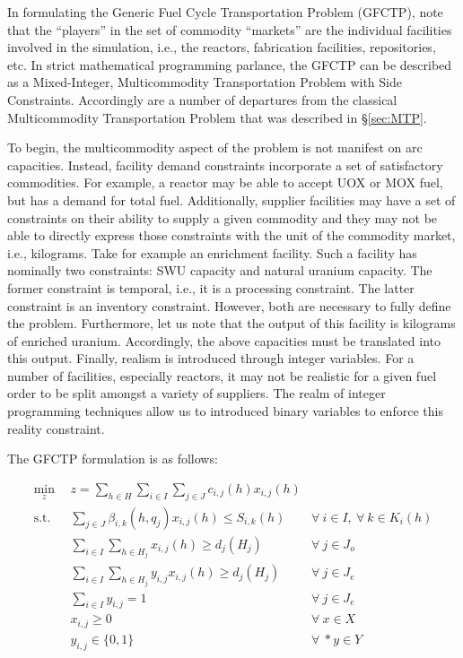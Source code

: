 In formulating the Generic Fuel Cycle Transportation Problem (GFCTP), note that
the ``players'' in the set of commodity ``markets'' are the individual
facilities involved in the simulation, i.e., the reactors, fabrication
facilities, repositories, etc. In strict mathematical programming parlance, the
GFCTP can be described as a Mixed-Integer, Multicommodity Transportation Problem
with Side Constraints. Accordingly are a number of departures from the classical
Multicommodity Transportation Problem that was described in \S\ref{sec:MTP}.

To begin, the multicommodity aspect of the problem is not manifest on arc
capacities. Instead, facility demand constraints incorporate a set of
satisfactory commodities. For example, a reactor may be able to accept UOX or
MOX fuel, but has a demand for total fuel. Additionally, supplier facilities may
have a set of constraints on their ability to supply a given commodity and they
may not be able to directly express those constraints with the unit of the
commodity market, i.e., kilograms. Take for example an enrichment facility. Such
a facility has nominally two constraints: SWU capacity and natural uranium
capacity. The former constraint is temporal, i.e., it is a processing
constraint. The latter constraint is an inventory constraint. However, both are
necessary to fully define the problem. Furthermore, let us note that the output
of this facility is kilograms of enriched uranium. Accordingly, the above
capacities must be translated into this output. Finally, realism is introduced
through integer variables. For a number of facilities, especially reactors, it
may not be realistic for a given fuel order to be split amongst a variety of
suppliers. The realm of integer programming techniques allow us to introduced
binary variables to enforce this reality constraint.

The GFCTP formulation is as follows:

\begin{subequations}\label{eqs:GFCTP}
  \begin{align}
    \min_{z} \:\: & 
    z = \sum_{h \in H}\sum_{i \in I}\sum_{j \in J}c_{i,j}(h) x_{i,j}(h) 
    & \label{eq:GFCTP_obj} \\
    \text{s.t.} \:\: &
    \sum_{j \in J}\beta_{i,k}(h,q_{j}) x_{i,j}(h) \leq S_{i,k}(h) 
    & 
    \forall \: i \in I, \: \forall \: k \in K_{i}(h) \label{eq:GFCTP_sup} \\
    &
    \sum_{i \in I}\sum_{h \in H_{j}} x_{i,j}(h) \geq d_{j}(H_{j}) 
    & 
    \forall \: j \in J_{o} \label{eq:GFCTP_dem_o} \\
    &
    \sum_{i \in I}\sum_{h \in H_{j}} y_{i,j} x_{i,j}(h) \geq d_{j}(H_{j}) 
    &
    \forall \: j \in J_{e} \label{eq:GFCTP_dem_e} \\
    &
    \sum_{i \in I} y_{i,j} = 1
    &
    \forall \: j \in J_{e} \label{eq:GFCTP_sumy} \\
    &
    x_{i,j} \geq 0
    &
    \forall \: x \in X \label{eq:GFCTP_x} \\
    &
    y_{i,j} \in \{0,1\}
    &
    \forall \:* y \in Y \label{eq:GFCTP_y}
  \end{align}
\end{subequations}
